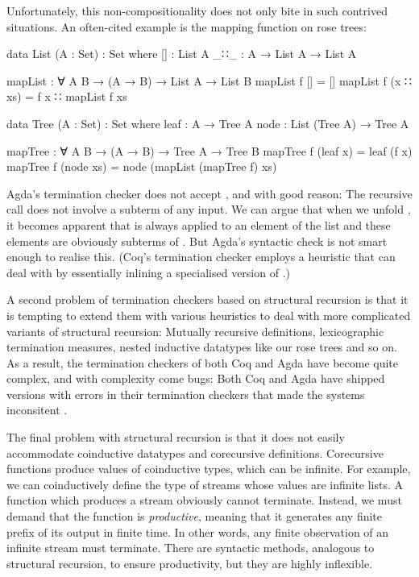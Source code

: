 Unfortunately, this non-compositionality does not only bite in such contrived
situations. An often-cited example is the mapping function on rose trees:
\begin{code}
  data List (A : Set) : Set where
    []  : List A
    _∷_ : A → List A → List A

  mapList : ∀ {A B} → (A → B) → List A → List B
  mapList f []       = []
  mapList f (x ∷ xs) = f x ∷ mapList f xs

  data Tree (A : Set) : Set where
    leaf : A → Tree A
    node : List (Tree A) → Tree A

  mapTree : ∀ {A B} → (A → B) → Tree A → Tree B
  mapTree f (leaf x)  = leaf (f x)
  mapTree f (node xs) = node (mapList (mapTree f) xs)
\end{code}
Agda's termination checker does not accept , and with good
reason: The recursive call does not involve a subterm of any input. We can argue
that when we unfold , it becomes apparent that  is
always applied to an element of the list  and these elements are
obviously subterms of . But Agda's syntactic check is not smart enough
to realise this. (Coq's termination checker employs a heuristic that can deal
with  by essentially inlining a specialised version of
.)

A second problem of termination checkers based on structural recursion is that
it is tempting to extend them with various heuristics to deal with more
complicated variants of structural recursion: Mutually recursive definitions,
lexicographic termination measures, nested inductive datatypes like our rose
trees and so on. As a result, the termination checkers of both Coq and Agda have
become quite complex, and with complexity come bugs: Both Coq and Agda have
shipped versions with errors in their termination checkers that made the systems
inconsitent \cite{coqbug2013,agdabug2013}.

The final problem with structural recursion is that it does not easily
accommodate coinductive datatypes and corecursive definitions. Corecursive
functions produce values of coinductive types, which can be infinite. For
example, we can coinductively define the type of streams whose values are
infinite lists. A function which produces a stream obviously cannot terminate.
Instead, we must demand that the function is \emph{productive}, meaning that it
generates any finite prefix of its output in finite time. In other words, any
finite observation of an infinite stream must terminate. There are syntactic
methods, analogous to structural recursion, to ensure productivity, but they are
highly inflexible.

